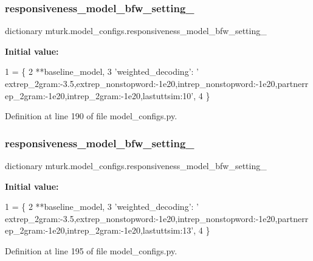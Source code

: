 \subsubsection{\texorpdfstring{responsiveness\+\_\+model\+\_\+bfw\+\_\+setting\+\_}{responsiveness\_model\_bfw\_setting\_10}}
{\footnotesize\ttfamily dictionary mturk.\+model\+\_\+configs.\+responsiveness\+\_\+model\+\_\+bfw\+\_\+setting\+\_}

{\bfseries Initial value\+:}
\begin{DoxyCode}
1 =  \{
2     **baseline\_model,
3     \textcolor{stringliteral}{'weighted\_decoding'}: \textcolor{stringliteral}{'
      extrep\_2gram:-3.5,extrep\_nonstopword:-1e20,intrep\_nonstopword:-1e20,partnerrep\_2gram:-1e20,intrep\_2gram:-1e20,lastuttsim:10'},
4 \}
\end{DoxyCode}


Definition at line 190 of file model\+\_\+configs.\+py.

\mbox{\label{namespacemturk_1_1model__configs_aef1c5f9d24acd20446c2767027358ea4}} 
\subsubsection{\texorpdfstring{responsiveness\+\_\+model\+\_\+bfw\+\_\+setting\+\_}{responsiveness\_model\_bfw\_setting\_13}}
{\footnotesize\ttfamily dictionary mturk.\+model\+\_\+configs.\+responsiveness\+\_\+model\+\_\+bfw\+\_\+setting\+\_}

{\bfseries Initial value\+:}
\begin{DoxyCode}
1 =  \{
2     **baseline\_model,
3     \textcolor{stringliteral}{'weighted\_decoding'}: \textcolor{stringliteral}{'
      extrep\_2gram:-3.5,extrep\_nonstopword:-1e20,intrep\_nonstopword:-1e20,partnerrep\_2gram:-1e20,intrep\_2gram:-1e20,lastuttsim:13'},
4 \}
\end{DoxyCode}


Definition at line 195 of file model\+\_\+configs.\+py.

\mbox{\label{namespacemturk_1_1model__configs_a1eb7adcca60944926e9867051c3121b6}} 
